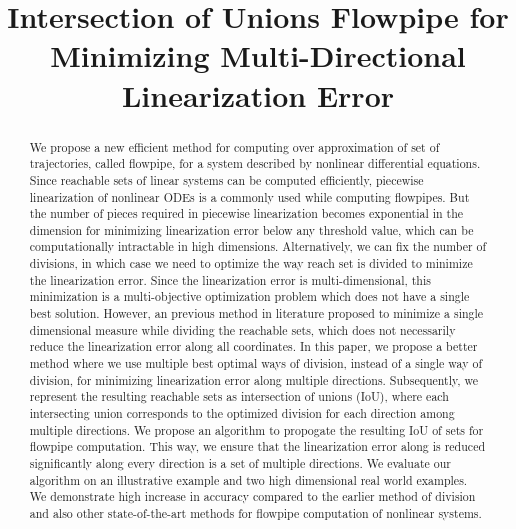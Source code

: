 


\title{Intersection of Unions Flowpipe for Minimizing Multi-Directional Linearization Error}
\author{}
\institute{}
%
    
\maketitle
%
\begin{abstract}
We propose a new efficient method for computing over approximation of
set of trajectories, called flowpipe, for a system described by
nonlinear differential equations.  Since reachable sets of linear
systems can be computed efficiently, piecewise linearization of
nonlinear ODEs is a commonly used while computing flowpipes.  But the
number of pieces required in piecewise linearization becomes
exponential in the dimension for minimizing linearization error below
any threshold value, which can be computationally intractable in high
dimensions.  Alternatively, we can fix the number of divisions, in
which case we need to optimize the way reach set is divided to
minimize the linearization error.  Since the linearization error is
multi-dimensional, this minimization is a multi-objective optimization
problem which does not have a single best solution.  However, an
previous method in literature proposed to minimize a single
dimensional measure while dividing the reachable sets, which does not
necessarily reduce the linearization error along all coordinates.  In
this paper, we propose a better method where we use multiple best
optimal ways of division, instead of a single way of division, for
minimizing linearization error along multiple directions.
Subsequently, we represent the resulting reachable sets as
intersection of unions (IoU), where each intersecting union
corresponds to the optimized division for each direction among
multiple directions.  We propose an algorithm to propogate the
resulting IoU of sets for flowpipe computation.  This way, we ensure
that the linearization error along is reduced significantly along
every direction is a set of multiple directions.  We evaluate our
algorithm on an illustrative example and two high dimensional real
world examples.  We demonstrate high increase in accuracy compared to
the earlier method of division and also other state-of-the-art methods
for flowpipe computation of nonlinear systems.
\end{abstract}

